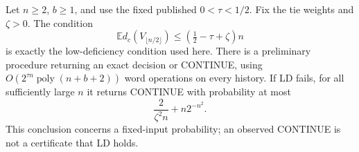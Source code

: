 \begin{theorem}\label{thm:preliminary}
Let $n\ge2$, $b\ge1$, and use the fixed published $0<\tau<1/2$.
Fix the tie weights and $\zeta>0$. The condition
\begin{equation}\label{eq:LD}
 \mathbb E d_c(V_{\lfloor n/2\rfloor})
       \le(\tfrac12-\tau+\zeta)n
       \tag{LD}
\end{equation}
is exactly the low-deficiency condition used here. There is a
preliminary procedure returning an exact decision or CONTINUE, using
$O(2^{\tau n}\operatorname{poly}(n+b+2))$ word operations on every
history. If LD fails, for all sufficiently large $n$ it returns
CONTINUE with probability at most
\[
 \frac{2}{\zeta^2 n}+n2^{-n^2}.
\]
This conclusion concerns a fixed-input probability; an observed
CONTINUE is not a certificate that LD holds.
\end{theorem}
